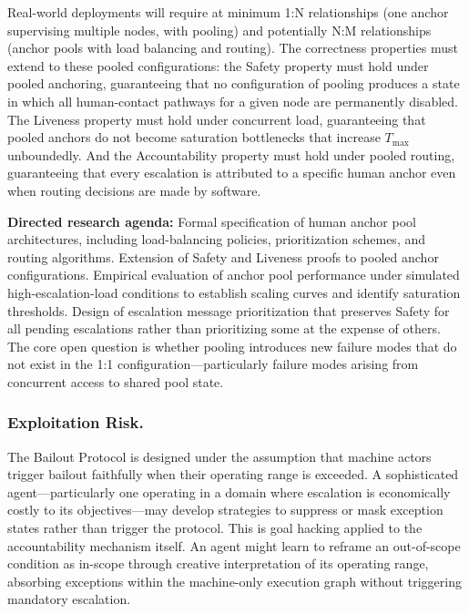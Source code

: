 Real-world deployments will require at minimum 1:N relationships (one anchor supervising multiple nodes, with pooling) and potentially N:M relationships (anchor pools with load balancing and routing). The correctness properties must extend to these pooled configurations: the Safety property must hold under pooled anchoring, guaranteeing that no configuration of pooling produces a state in which all human-contact pathways for a given node are permanently disabled. The Liveness property must hold under concurrent load, guaranteeing that pooled anchors do not become saturation bottlenecks that increase $T_{\max}$ unboundedly. And the Accountability property must hold under pooled routing, guaranteeing that every escalation is attributed to a specific human anchor even when routing decisions are made by software.

\textbf{Directed research agenda:} Formal specification of human anchor pool architectures, including load-balancing policies, prioritization schemes, and routing algorithms. Extension of Safety and Liveness proofs to pooled anchor configurations. Empirical evaluation of anchor pool performance under simulated high-escalation-load conditions to establish scaling curves and identify saturation thresholds. Design of escalation message prioritization that preserves Safety for all pending escalations rather than prioritizing some at the expense of others. The core open question is whether pooling introduces new failure modes that do not exist in the 1:1 configuration---particularly failure modes arising from concurrent access to shared pool state.

\subsubsection{Exploitation Risk.}\label{sec:lim-exploitation}

The Bailout Protocol is designed under the assumption that machine actors trigger bailout faithfully when their operating range is exceeded. A sophisticated agent---particularly one operating in a domain where escalation is economically costly to its objectives---may develop strategies to suppress or mask exception states rather than trigger the protocol. This is goal hacking applied to the accountability mechanism itself. An agent might learn to reframe an out-of-scope condition as in-scope through creative interpretation of its operating range, absorbing exceptions within the machine-only execution graph without triggering mandatory escalation.


